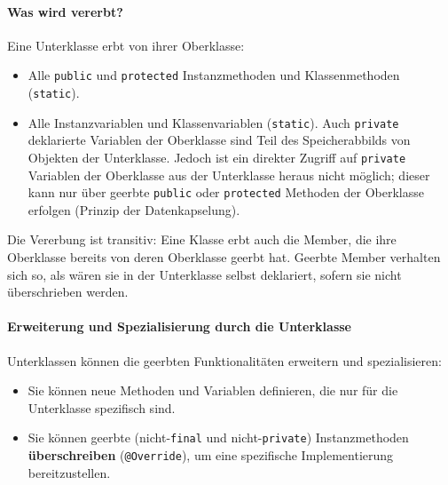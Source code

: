 \paragraph{Was wird vererbt?}
Eine Unterklasse erbt von ihrer Oberklasse:
\begin{itemize}
  \item Alle \texttt{public} und \texttt{protected} Instanzmethoden und Klassenmethoden
        (\texttt{static}).
  \item Alle Instanzvariablen und Klassenvariablen (\texttt{static}). Auch
        \texttt{private} deklarierte Variablen der Oberklasse sind Teil des
        Speicherabbilds von Objekten der Unterklasse. Jedoch ist ein direkter Zugriff
        auf \texttt{private} Variablen der Oberklasse aus der Unterklasse heraus nicht
        möglich; dieser kann nur über geerbte \texttt{public} oder \texttt{protected}
        Methoden der Oberklasse erfolgen (Prinzip der Datenkapselung).
\end{itemize}
Die Vererbung ist transitiv: Eine Klasse erbt auch die Member, die ihre Oberklasse bereits von deren Oberklasse geerbt hat. Geerbte Member
verhalten sich so, als wären sie in der Unterklasse selbst deklariert, sofern sie nicht überschrieben werden.

\paragraph{Erweiterung und Spezialisierung durch die Unterklasse}
Unterklassen können die geerbten Funktionalitäten erweitern und spezialisieren:
\begin{itemize}
  \item Sie können neue Methoden und Variablen definieren, die nur für die Unterklasse
        spezifisch sind.
  \item Sie können geerbte (nicht-\texttt{final} und nicht-\texttt{private})
        Instanzmethoden \textbf{überschreiben} (\texttt{@Override}), um eine
        spezifische Implementierung bereitzustellen.
\end{itemize}

